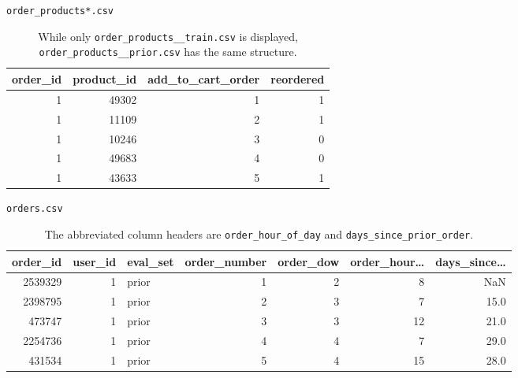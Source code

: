 \documentclass[11pt]{article}
\theoremstyle{definition}
\numberwithin{equation}{section}
\begin{document}


\begin{table}[h]
  \centering
  \caption{\texttt{order\_products*.csv}}
  \label{tab:order-products}
  {\ttfamily
  \begin{tabular}{rrrr}
    \toprule
    order\_id & product\_id & add\_to\_cart\_order & reordered \\
    \midrule
    1         & 49302       & 1                    & 1         \\
    1         & 11109       & 2                    & 1         \\
    1         & 10246       & 3                    & 0         \\
    1         & 49683       & 4                    & 0         \\
    1         & 43633       & 5                    & 1         \\
    \bottomrule
  \end{tabular}
  }
  \captionsetup{width=0.6\linewidth}
  \caption*{While only \texttt{order\_products\_\_train.csv} is displayed, \texttt{order\_products\_\_prior.csv} has the same structure.}
\end{table}


\begin{table}[h]
  \centering
  \caption{\texttt{orders.csv}}
  \label{tab:orders}
{\ttfamily
  \begin{tabular}{rrlrrrr}
    \toprule
    order\_id & user\_id & eval\_set & order\_number & order\_dow & order\_hour\ldots & days\_since\ldots \\
    \midrule
    2539329   & 1        & prior     & 1             & 2          & 8                 & NaN               \\
    2398795   & 1        & prior     & 2             & 3          & 7                 & 15.0              \\
    473747    & 1        & prior     & 3             & 3          & 12                & 21.0              \\
    2254736   & 1        & prior     & 4             & 4          & 7                 & 29.0              \\
    431534    & 1        & prior     & 5             & 4          & 15                & 28.0              \\
    \bottomrule
  \end{tabular}
  }
  \caption*{The abbreviated column headers are \texttt{order\_hour\_of\_day} and \texttt{days\_since\_prior\_order}.}
\end{table}
\end{document}
